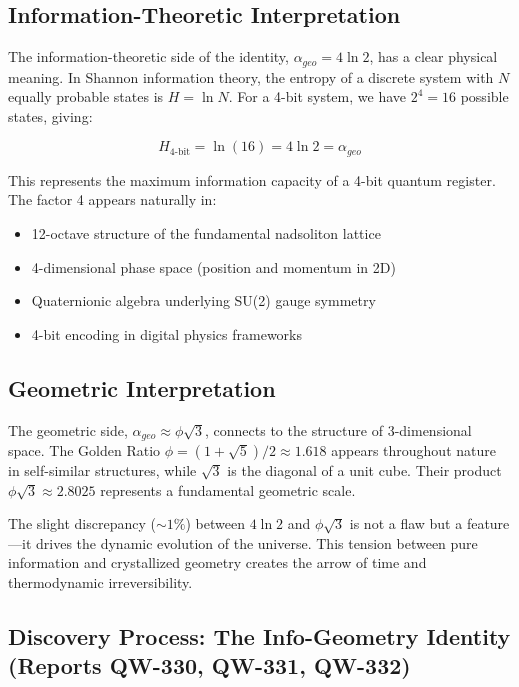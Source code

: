 \documentclass[11pt, a4paper]{article}
\begin{document}
\subsection{Information-Theoretic Interpretation}

The information-theoretic side of the identity, $\alpha_{geo} = 4\ln 2$, has a clear physical meaning. In Shannon information theory, the entropy of a discrete system with $N$ equally probable states is $H = \ln N$. For a 4-bit system, we have $2^4 = 16$ possible states, giving:

\begin{equation}
H_{4\text{-bit}} = \ln(16) = 4\ln 2 = \alpha_{geo}
\end{equation}

This represents the maximum information capacity of a 4-bit quantum register. The factor 4 appears naturally in:
\begin{itemize}
    \item 12-octave structure of the fundamental nadsoliton lattice
    \item 4-dimensional phase space (position and momentum in 2D)
    \item Quaternionic algebra underlying SU(2) gauge symmetry
    \item 4-bit encoding in digital physics frameworks
\end{itemize}

\subsection{Geometric Interpretation}

The geometric side, $\alpha_{geo} \approx \phi\sqrt{3}$, connects to the structure of 3-dimensional space. The Golden Ratio $\phi = (1+\sqrt{5})/2 \approx 1.618$ appears throughout nature in self-similar structures, while $\sqrt{3}$ is the diagonal of a unit cube. Their product $\phi\sqrt{3} \approx 2.8025$ represents a fundamental geometric scale.

The slight discrepancy ($\sim 1\%$) between $4\ln 2$ and $\phi\sqrt{3}$ is not a flaw but a feature—it drives the dynamic evolution of the universe. This tension between pure information and crystallized geometry creates the arrow of time and thermodynamic irreversibility.

\subsection{Discovery Process: The Info-Geometry Identity (Reports QW-330, QW-331, QW-332)}
\end{document}
